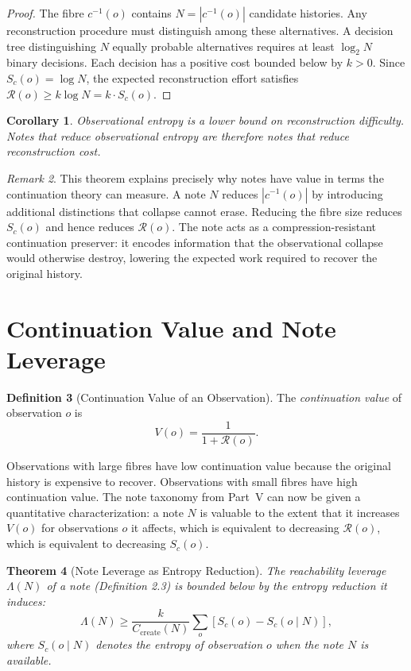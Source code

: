 \documentclass[12pt, a4paper, openany]{book}
\theoremstyle{plain}
\newtheorem{theorem}{Theorem}[chapter]
\newtheorem{corollary}[theorem]{Corollary}
\theoremstyle{definition}
\newtheorem{definition}[theorem]{Definition}
\theoremstyle{remark}
\newtheorem{remark}[theorem]{Remark}
\newcommand{\calR}{\mathcal{R}}
\begin{document}
\begin{proof}
The fibre $c^{-1}(o)$ contains $N = |c^{-1}(o)|$ candidate histories. Any
reconstruction procedure must distinguish among these alternatives. A decision
tree distinguishing $N$ equally probable alternatives requires at least $\log_2 N$
binary decisions. Each decision has a positive cost bounded below by $k > 0$.
Since $S_c(o) = \log N$, the expected reconstruction effort satisfies
$\calR(o) \geq k \log N = k \cdot S_c(o)$.
\end{proof}

\begin{corollary}
Observational entropy is a lower bound on reconstruction difficulty. Notes that
reduce observational entropy are therefore notes that reduce reconstruction cost.
\end{corollary}

\begin{remark}
This theorem explains precisely why notes have value in terms the continuation
theory can measure. A note $N$ reduces $|c^{-1}(o)|$ by introducing additional
distinctions that collapse cannot erase. Reducing the fibre size reduces $S_c(o)$
and hence reduces $\calR(o)$. The note acts as a compression-resistant continuation
preserver: it encodes information that the observational collapse would otherwise
destroy, lowering the expected work required to recover the original history.
\end{remark}

\section{Continuation Value and Note Leverage}

\begin{definition}[Continuation Value of an Observation]
The \emph{continuation value} of observation $o$ is
\[
V(o) = \frac{1}{1 + \calR(o)}.
\]
\end{definition}

Observations with large fibres have low continuation value because the
original history is expensive to recover. Observations with small fibres have
high continuation value. The note taxonomy from Part~V can now be given a
quantitative characterization: a note $N$ is valuable to the extent that it
increases $V(o)$ for observations $o$ it affects, which is equivalent to
decreasing $\calR(o)$, which is equivalent to decreasing $S_c(o)$.

\begin{theorem}[Note Leverage as Entropy Reduction]
The reachability leverage $\Lambda(N)$ of a note (Definition 2.3) is bounded
below by the entropy reduction it induces:
\[
\Lambda(N) \geq \frac{k}{C_{\mathrm{create}}(N)} \sum_{o} [S_c(o) - S_c(o \mid N)],
\]
where $S_c(o \mid N)$ denotes the entropy of observation $o$ when the note $N$
is available.
\end{theorem}
\end{document}
